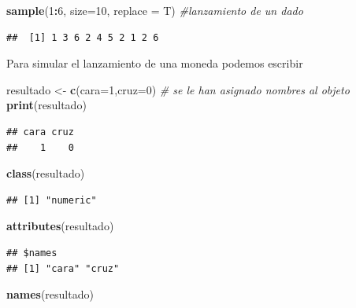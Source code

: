 \documentclass[]{book}
\newenvironment{Shaded}{\begin{snugshade}}{\end{snugshade}}
\newcommand{\CommentTok}[1]{\textcolor[rgb]{0.56,0.35,0.01}{\textit{#1}}}
\newcommand{\DataTypeTok}[1]{\textcolor[rgb]{0.13,0.29,0.53}{#1}}
\newcommand{\DecValTok}[1]{\textcolor[rgb]{0.00,0.00,0.81}{#1}}
\newcommand{\KeywordTok}[1]{\textcolor[rgb]{0.13,0.29,0.53}{\textbf{#1}}}
\newcommand{\NormalTok}[1]{#1}
\newcommand{\OperatorTok}[1]{\textcolor[rgb]{0.81,0.36,0.00}{\textbf{#1}}}
\newcommand{\StringTok}[1]{\textcolor[rgb]{0.31,0.60,0.02}{#1}}
\begin{document}
\begin{Shaded}
\begin{Highlighting}[]
\KeywordTok{sample}\NormalTok{(}\DecValTok{1}\OperatorTok{:}\DecValTok{6}\NormalTok{, }\DataTypeTok{size=}\DecValTok{10}\NormalTok{, }\DataTypeTok{replace =}\NormalTok{ T) }\CommentTok{#lanzamiento de un dado}
\end{Highlighting}
\end{Shaded}

\begin{verbatim}
##  [1] 1 3 6 2 4 5 2 1 2 6
\end{verbatim}

Para simular el lanzamiento de una moneda podemos escribir

\begin{Shaded}
\begin{Highlighting}[]
\NormalTok{resultado <-}\StringTok{ }\KeywordTok{c}\NormalTok{(}\DataTypeTok{cara=}\DecValTok{1}\NormalTok{,}\DataTypeTok{cruz=}\DecValTok{0}\NormalTok{) }\CommentTok{# se le han asignado nombres al objeto}
\KeywordTok{print}\NormalTok{(resultado)}
\end{Highlighting}
\end{Shaded}

\begin{verbatim}
## cara cruz 
##    1    0
\end{verbatim}

\begin{Shaded}
\begin{Highlighting}[]
\KeywordTok{class}\NormalTok{(resultado)}
\end{Highlighting}
\end{Shaded}

\begin{verbatim}
## [1] "numeric"
\end{verbatim}

\begin{Shaded}
\begin{Highlighting}[]
\KeywordTok{attributes}\NormalTok{(resultado)}
\end{Highlighting}
\end{Shaded}

\begin{verbatim}
## $names
## [1] "cara" "cruz"
\end{verbatim}

\begin{Shaded}
\begin{Highlighting}[]
\KeywordTok{names}\NormalTok{(resultado)}
\end{Highlighting}
\end{Shaded}
\end{document}
